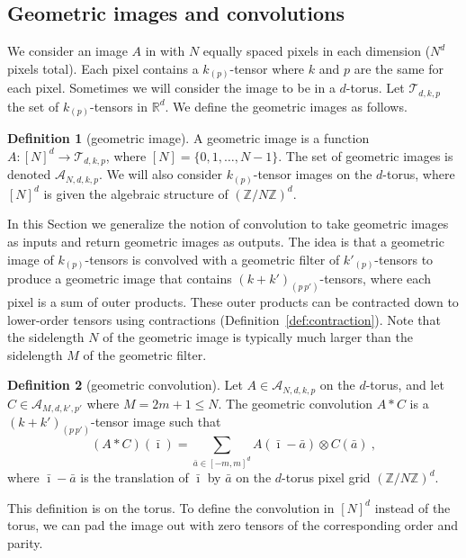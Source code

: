 \documentclass{article}
\theoremstyle{definition}
\newtheorem{definition}{Definition}
\newcommand{\tensorname}[2]{{#1}_{(#2)}}
\newcommand{\tensor}[2]{$\tensorname{#1}{#2}$-tensor}
\newcommand{\sectionname}{Section}
\begin{document}
\subsection{Geometric images and convolutions}\label{sec:convolution}

We consider an image $A$ in with $N$ equally spaced pixels in each dimension ($N^d$ pixels total). Each pixel contains a \tensor{k}{p} where $k$ and $p$ are the same for each pixel. Sometimes we will consider the image to be in a $d$-torus. 
Let $\mathcal T_{d,k,p}$ the set of \tensor{k}{p}s in $\mathbb R^d$. We define the geometric images as follows.

\begin{definition}[geometric image]
A geometric image is a function $A:[N]^d \to \mathcal T_{d,k,p}$, where $[N]=\{0,1,\ldots, N-1\}$. The set of geometric images is denoted $\mathcal{A}_{N,d,k,p}$. We will also consider \tensor{k}{p} images on the $d$-torus, where $[N]^d$ is given the algebraic structure of $(\mathbb Z / N\mathbb Z)^d$.
\end{definition}

In this \sectionname{} we generalize the notion of convolution to take geometric images as inputs and return geometric images as outputs.
The idea is that a geometric image of \tensor{k}{p}s is convolved with a geometric filter of \tensor{k'}{p}s to produce a geometric image that contains \tensor{(k+k')}{p\,p'}s, where each pixel is a sum of outer products. These outer products can be contracted down to lower-order tensors using contractions (Definition~\ref{def:contraction}). Note that the sidelength $N$ of the geometric image is typically much larger than the sidelength $M$ of the geometric filter.

\begin{definition}[geometric convolution]\label{def:convolution}
Let $A \in \mathcal{A}_{N,d,k,p}$ on the $d$-torus, and let $C \in \mathcal{A}_{M,d,k',p'}$ where $M=2m+1\leq N$.
The geometric convolution $A\ast C$ is a \tensor{(k+k')}{p\,p'} image such that
\begin{equation}
    (A\ast C)(\bar\imath) = \sum_{\bar a\in[-m, m]^d} A(\bar\imath - \bar a)\otimes C(\bar a) ~,
\end{equation}
where $\bar\imath - \bar a$ is the translation of $\bar\imath$ by $\bar a$ on the $d$-torus pixel grid $(\mathbb Z / N\mathbb Z)^d$.
\end{definition}
This definition is on the torus. To define the convolution in $[N]^d$ instead of the torus, we can pad the image out with zero tensors of the corresponding order and parity. 
\end{document}
